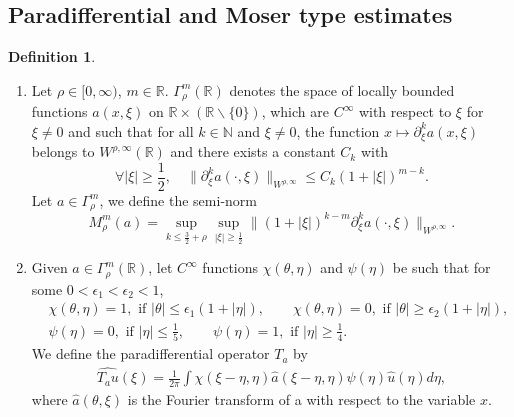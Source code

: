 \documentclass[10pt]{amsart}
\theoremstyle{remark}
\theoremstyle{definition}
\newtheorem{definition}[theorem]{Definition}
\numberwithin{equation}{section}
\begin{document}
\subsection{ Paradifferential and  Moser type estimates}
\begin{definition}
\begin{enumerate}
\item Let $\rho\in [0,\infty)$, $m\in \mathbb{R}$. 
$\Gamma^m_\rho(\mathbb{R})$ denotes the space of locally bounded functions $a(x, \xi)$ on $\mathbb{R}\times (\mathbb{R}\backslash \{0\})$, which are $C^\infty$ with respect to $\xi$ for $\xi \neq 0$ and such that for all $k \in \mathbb{N}$ and $\xi \neq 0$, the function $x\mapsto \partial_\xi^k a(x,\xi)$ belongs to $W^{\rho,\infty}(\mathbb{R})$ and there exists a constant $C_k$ with
\begin{equation*}
\forall |\xi|\geq \frac{1}{2}, \quad \|\partial_\xi^k a(\cdot,\xi) \|_{W^{\rho,\infty}} \leq C_k (1+ |\xi|)^{m-k}.
\end{equation*}
Let $a\in \Gamma^m_\rho$,  we define the semi-norm
\begin{equation*}
M^m_{\rho}(a) = \sup_{k \leq \frac{3}{2}+\rho} \sup_{|\xi|\geq \frac{1}{2}} \|(1+ |\xi|)^{k-m}\partial_\xi^k a(\cdot,\xi)  \|_{W^{\rho,\infty}}.
\end{equation*}
\item Given $a\in \Gamma^m_\rho(\mathbb{R})$, let $C^\infty$ functions $\chi(\theta, \eta)$ and $\psi(\eta)$ be such that for some $0<\epsilon_1 < \epsilon_2<1$,
\begin{align*}
    &\chi(\theta, \eta) = 1,  \text{ if } |\theta| \leq \epsilon_1(1+ |\eta|), \qquad \chi(\theta, \eta) = 0,  \text{ if } |\theta| \geq \epsilon_2(1+ |\eta|),\\
    &\psi(\eta) = 0, \text{ if } |\eta|\leq \frac{1}{5}, \qquad \psi(\eta) =1, \text{ if } |\eta|\geq \frac{1}{4}.
\end{align*}
We define the paradifferential operator $T_a$ by
\begin{align*}
 \widehat{T_a u}(\xi) = \frac{1}{2\pi}\int \chi(\xi -\eta, \eta) \hat{a}(\xi-\eta, \eta)\psi(\eta)\hat{u}(\eta) d\eta,
\end{align*}
where $\hat{a}(\theta, \xi)$ is the Fourier transform of a with respect to the  variable $x$.



\end{enumerate}
\end{definition}
\end{document}
